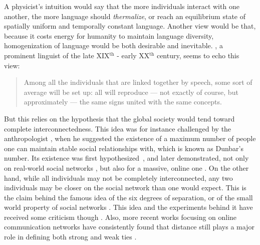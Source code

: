 \documentclass[../thesis.tex]{subfiles}
\begin{document}

A physicist's intuition would say that the more individuals interact with one another,
the more language should \emph{thermalize}, or reach an equilibrium state of spatially
uniform and temporally constant language. Another view would be that, because it costs
energy for humanity to maintain language diversity, homogenization of language would be
both desirable and inevitable.
, a prominent linguist of the
late XIX$^\text{th}$ - early XX$^\text{th}$ century, seems to echo this view:

\begin{quote}
  Among all the individuals that are linked together by speech, some sort of average
  will be set up: all will reproduce --- not exactly of course, but approximately ---
  the same signs united with the same concepts. \cite{deSaussureCourseGeneral2011}
\end{quote}


But this relies on the hypothesis that the global
society would tend toward complete interconnectedness. This idea was for instance
challenged by the anthropologist , when he
suggested the existence of a maximum number of people one can maintain stable social
relationships with, which is known as Dunbar's number. Its existence was first
hypothesized~\cite{DunbarNeocortexSize1992,DunbarSocialBrain1998}, and later
demonstrated, not only on real-world social networks
\cite{HillSocialNetwork2003,McCartyComparingTwo2005}, but also for a massive, online one
\cite{GoncalvesModelingUsers2011}.
On the other hand, while all individuals may not be completely interconnected, any two
individuals may be closer on the social network than one would expect. This is the claim
behind the famous idea of the six degrees of separation, or of the small world property
of social networks
\cite{deSolaPoolContactsInfluence1978,MilgramSmallWorld1967,TraversExperimentalStudy1977a,WattsCollectiveDynamics1998}.
This idea and the experiments behind it have received some criticism though
\cite{KleinfeldSmallWorld2002}. Also, more recent works focusing on online communication
networks have consistently found that distance still plays a major role in defining both
strong and weak ties
\cite{LeskovecPlanetaryscaleViews2008,TakhteyevGeographyTwitter2012a,Garcia-GavilanesTwitterAin2014}. 
\end{document}
